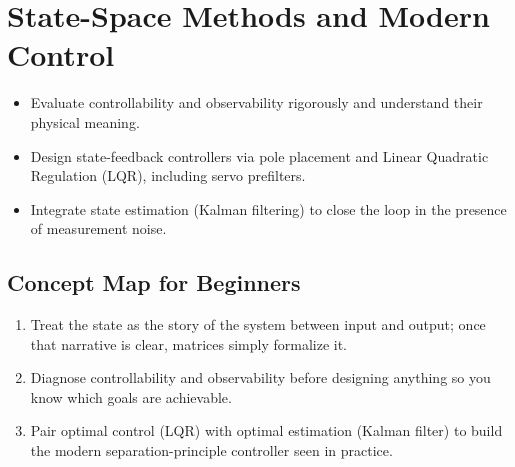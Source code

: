 \chapter{State-Space Methods and Modern Control}
\label{chap:modern}

\begin{learningobjective}
\begin{itemize}[leftmargin=*]
    \item Evaluate controllability and observability rigorously and understand their physical meaning.
    \item Design state-feedback controllers via pole placement and Linear Quadratic Regulation (LQR), including servo prefilters.
    \item Integrate state estimation (Kalman filtering) to close the loop in the presence of measurement noise.
\end{itemize}
\end{learningobjective}

\section{Concept Map for Beginners}
\begin{conceptroadmap}
\begin{enumerate}[leftmargin=*]
    \item Treat the state as the story of the system between input and output; once that narrative is clear, matrices simply formalize it.
    \item Diagnose controllability and observability before designing anything so you know which goals are achievable.
    \item Pair optimal control (LQR) with optimal estimation (Kalman filter) to build the modern separation-principle controller seen in practice.
\end{enumerate}
\end{conceptroadmap}

